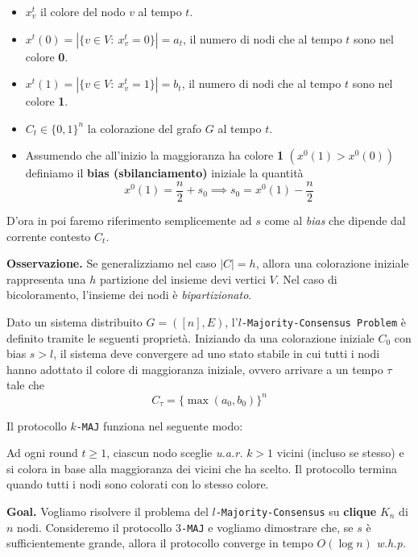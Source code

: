 \begin{itemize}
    \item $x^t_v$ il colore del nodo $v$ al tempo $t$.
    \item $x^t(0) = |\{ v \in V:\ x^t_v = 0 \}| = a_t$, il numero di nodi che al tempo $t$ sono nel colore \textbf{0}.
    \item $x^t(1) = |\{ v \in V:\ x^t_v = 1 \}| = b_t$, il numero di nodi che al tempo $t$ sono nel colore \textbf{1}.
    \item $C_t \in \{0, 1\}^n$ la colorazione del grafo $G$ al tempo $t$.
    \item Assumendo che all'inizio la maggioranza ha colore \textbf{1} $\left( x^0(1) > x^0(0) \right)$ definiamo il \textbf{bias (sbilanciamento)} iniziale la quantità
    \[
        x^0(1) = \frac{n}{2} + s_0 \implies s_0 = x^0(1) - \frac{n}{2}
    \]
\end{itemize}
D'ora in poi faremo riferimento semplicemente ad $s$ come al \textit{bias} che dipende dal corrente contesto $C_t$.

\textbf{Osservazione.} Se generalizziamo nel caso $|C| = h$, allora una colorazione iniziale rappresenta una $h$ partizione del insieme devi vertici $V$. Nel caso di bicoloramento, l'insieme dei nodi è \textit{bipartizionato}.

\begin{definizione}
    Dato un sistema distribuito $G = ([n], E)$, l'$l$\texttt{-Majority-Consensus Problem} è definito tramite le seguenti proprietà. Iniziando da una colorazione iniziale $C_0$ con bias $s > l$, il sistema deve convergere ad uno stato stabile in cui tutti i nodi hanno adottato il colore di maggioranza iniziale, ovvero arrivare a un tempo $\tau$ tale che
    \[
        C_{\tau} = \{ \max(a_0, b_0) \}^n
    \]
\end{definizione}

\begin{definizione}
    Il protocollo $k$\texttt{-MAJ} funziona nel seguente modo:
    
    Ad ogni round $t \geq 1$, ciascun nodo sceglie \textit{u.a.r.} $k>1$ vicini (incluso se stesso) e si colora in base alla maggioranza dei vicini che ha scelto. Il protocollo termina quando tutti i nodi sono colorati con lo stesso colore.
\end{definizione}

\textbf{Goal.} Vogliamo risolvere il problema del $l$\texttt{-Majority-Consensus} su \textbf{clique} $K_n$ di $n$ nodi. Consideremo il protocollo $3$\texttt{-MAJ} e vogliamo dimostrare che, se $s$ è sufficientemente grande, allora il protocollo converge in tempo $O(\log n)$ \textit{w.h.p.}

